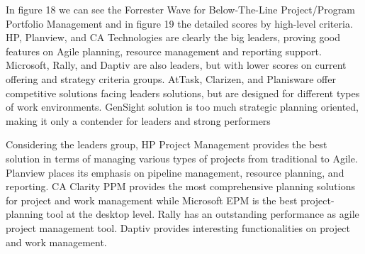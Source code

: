 In figure 18 we can see the Forrester Wave for Below-The-Line Project/Program Portfolio Management and in figure 19 the detailed scores by high-level criteria. HP, Planview, and CA Technologies are clearly the big leaders, proving good features on Agile planning, resource management and reporting support. Microsoft, Rally, and Daptiv are also leaders, but with lower scores on current offering and strategy criteria groups. AtTask, Clarizen, and Planisware offer competitive solutions facing leaders solutions, but are designed for different types of work environments. GenSight solution is too much strategic planning oriented, making it only a contender for leaders and strong performers\par
Considering the leaders group, HP Project Management provides the best solution in terms of managing various types of projects from traditional to Agile. Planview places its emphasis on pipeline management, resource planning, and reporting. CA Clarity PPM provides the most comprehensive planning solutions for project and work management while Microsoft EPM is the best project-planning tool at the desktop level. Rally has an outstanding performance as agile project management tool. Daptiv provides interesting functionalities on project and work management.\par

